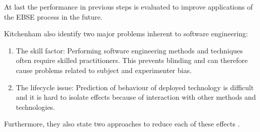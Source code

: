 At last the performance in previous steps is evaluated to improve applications  of the EBSE process in the future.

Kitchenham \etal also identify two major problems inherent to software engineering:
\begin{enumerate}
\item The skill factor: Performing software engineering methods and techniques often require skilled practitioners. This prevents blinding and can therefore cause problems related to subject and experimenter bias.
\item The lifecycle issue: Prediction of behaviour of deployed technology is difficult and it is hard to isolate effects because of interaction with other methods and technologies.
\end{enumerate}

Furthermore, they also state two approaches to reduce each of these effects \cite{EBSE}.

